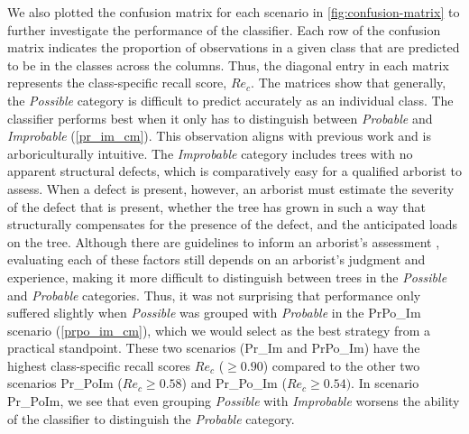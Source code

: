 \documentclass[Journal, letterpaper, DoubleSpace, InsideFigs]{ascelike-new}
\begin{document}
We also plotted the confusion matrix for each scenario in \autoref{fig:confusion-matrix} to further investigate the
performance of the classifier.  Each row of the confusion matrix indicates the proportion of observations in a given
class that are predicted to be in the classes across the columns.  Thus, the diagonal entry in each matrix represents
the class-specific recall score, $Re_{c}$.  The matrices show that generally, the \textit{Possible} category is
difficult to predict accurately as an individual class.  The classifier performs best when it only has to distinguish
between \textit{Probable} and \textit{Improbable} (\autoref{pr_im_cm}). This observation aligns with previous work \cite{koeser2020can} and is arboriculturally intuitive. The \textit{Improbable} category includes trees with no apparent structural defects, which is comparatively easy for a qualified arborist to assess. When a defect is present, however, an arborist must estimate the severity of the defect that is present, whether the tree has grown in such a way that structurally compensates for the presence of the defect, and the anticipated loads on the tree. Although there are guidelines to inform an arborist's assessment \cite{smiley2017best,goodfellow2020best}, evaluating each of these factors still depends on an arborist's judgment and experience, making it more difficult to distinguish between trees in the \textit{Possible} and \textit{Probable} categories. Thus, it was not surprising that performance only suffered slightly when
\textit{Possible} was grouped with \textit{Probable} in the PrPo\_Im scenario (\autoref{prpo_im_cm}), which we would
select as the best strategy from a practical standpoint.  These two scenarios (Pr\_Im and PrPo\_Im) have the highest
class-specific recall scores $Re_{c}$ ($\ge 0.90$) compared to the other two scenarios Pr\_PoIm ($Re_{c} \ge 0.58$) and
Pr\_Po\_Im ($Re_{c} \ge 0.54)$. In scenario Pr\_PoIm, we see that even grouping \textit{Possible} with
\textit{Improbable} worsens the ability of the classifier to distinguish the \textit{Probable} category.
\end{document}
